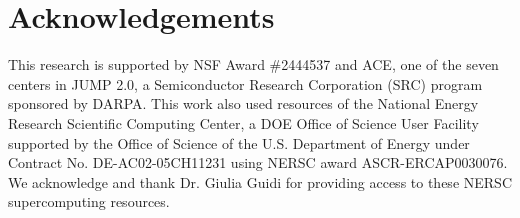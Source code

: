 \section{Acknowledgements}\label{sec:acknowledgements}
This research is supported by NSF Award \#2444537 and ACE, one of the seven centers in JUMP 2.0,
a Semiconductor Research Corporation (SRC) program sponsored by DARPA.
This work also used resources of the
National Energy Research Scientific Computing Center,
a DOE Office of Science User Facility supported by the Office of Science of the U.S.
Department of Energy under Contract No. DE-AC02-05CH11231 using NERSC award ASCR-ERCAP0030076.
We acknowledge and thank Dr. Giulia Guidi for providing access to these NERSC supercomputing resources.